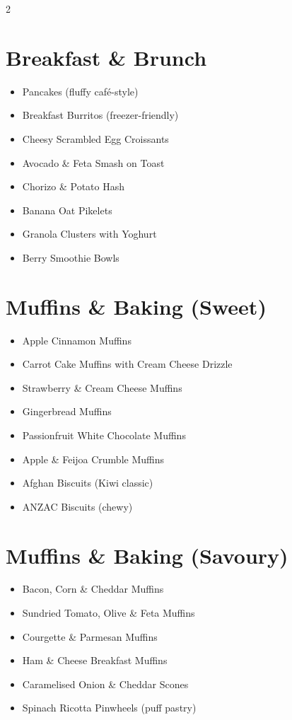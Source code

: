 \documentclass[13pt,a4paper]{book}
\begin{document}
\begin{multicols}{2}
\section*{Breakfast \& Brunch}
\begin{itemize}
\item Pancakes (fluffy café-style)
\item Breakfast Burritos (freezer-friendly)
\item Cheesy Scrambled Egg Croissants
\item Avocado \& Feta Smash on Toast
\item Chorizo \& Potato Hash
\item Banana Oat Pikelets
\item Granola Clusters with Yoghurt
\item Berry Smoothie Bowls
\end{itemize}

\section*{Muffins \& Baking (Sweet)}
\begin{itemize}
\item Apple Cinnamon Muffins
\item Carrot Cake Muffins with Cream Cheese Drizzle
\item Strawberry \& Cream Cheese Muffins
\item Gingerbread Muffins
\item Passionfruit White Chocolate Muffins
\item Apple \& Feijoa Crumble Muffins
\item Afghan Biscuits (Kiwi classic)
\item ANZAC Biscuits (chewy)
\end{itemize}

\section*{Muffins \& Baking (Savoury)}
\begin{itemize}
\item Bacon, Corn \& Cheddar Muffins
\item Sundried Tomato, Olive \& Feta Muffins
\item Courgette \& Parmesan Muffins
\item Ham \& Cheese Breakfast Muffins
\item Caramelised Onion \& Cheddar Scones
\item Spinach Ricotta Pinwheels (puff pastry)
\end{itemize}


\end{multicols}
\end{document}
